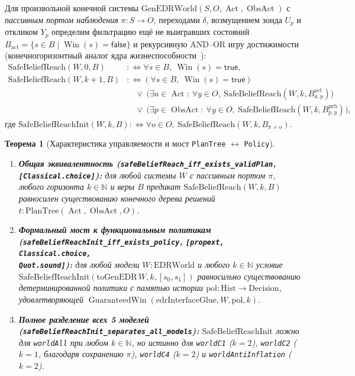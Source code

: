 \documentclass[10pt,a4paper]{article}
\theoremstyle{cleanthm}
\newtheorem{theorem}{Теорема}[section]
\theoremstyle{cleandef}
\DeclareMathOperator{\Win}{Win}
\DeclareMathOperator{\Act}{Act}
\DeclareMathOperator{\ObsAct}{ObsAct}
\DeclareMathOperator{\GuaranteedWin}{GuaranteedWin}
\begin{document}
Для произвольной конечной системы $\mathrm{GenEDRWorld}(S,O,\Act,\ObsAct)$ с \emph{пассивным портом наблюдения} $\pi:S\to O$, переходами $\delta$, возмущением зонда $U_p$ и откликом $Y_p$ определим фильтрацию ещё не выигравших состояний $B_{\mathrm{act}}=\{s\in B\mid\Win(s)=\mathsf{false}\}$ и рекурсивную AND--OR игру достижимости (конечногоризонтный аналог ядра жизнеспособности~\cite{aubin1991,bonet2000}):
\begin{align}
  \mathrm{SafeBeliefReach}(W,0,B) &:\iff \forall s\in B,\ \Win(s)=\mathsf{true}, \\
  \mathrm{SafeBeliefReach}(W,k+1,B) &:\iff (\forall s\in B,\ \Win(s)=\mathsf{true}) \nonumber\\
  &\quad\lor\; \bigl(\exists a\in\Act:\ \forall y\in O,\ \mathrm{SafeBeliefReach}(W,k,B_{a,y}^{\mathrm{act}})\bigr) \nonumber\\
  &\quad\lor\; \bigl(\exists p\in\ObsAct:\ \forall y\in O,\ \mathrm{SafeBeliefReach}(W,k,B_{p,y}^{\mathrm{prb}})\bigr),
\end{align}
где $\mathrm{SafeBeliefReachInit}(W,k,B) :\iff \forall o\in O,\ \mathrm{SafeBeliefReach}(W,k,B_{\pi=o})$.

\begin{theorem}[Характеристика управляемости и мост \texttt{PlanTree} $\leftrightarrow$ \texttt{Policy}]
\label{thm:sbr}
\begin{enumerate}
  \item \textbf{Общая эквивалентность (\texttt{safeBeliefReach\_\allowbreak iff\_\allowbreak exists\_\allowbreak validPlan}, \texttt{[Classical.choice]}):} для любой системы $W$ с пассивным портом $\pi$, любого горизонта $k\in\mathbb{N}$ и веры $B$ предикат $\mathrm{SafeBeliefReach}(W,k,B)$ равносилен существованию конечного дерева решений $t:\mathrm{PlanTree}(\Act,\ObsAct,O)$.
  \item \textbf{Формальный мост к функциональным политикам (\texttt{safeBeliefReachInit\_\allowbreak iff\_\allowbreak exists\_\allowbreak policy}, \texttt{[propext,}\\\texttt{Classical.choice,}\\\texttt{Quot.sound]}):} для любой модели $W:\mathrm{EDRWorld}$ и любого $k\in\mathbb{N}$ условие $\mathrm{SafeBeliefReachInit}(\allowbreak\mathrm{toGenEDR}\,W,\allowbreak k,\allowbreak [s_0,s_1])$ равносильно существованию детерминированной политики с памятью истории $\mathrm{pol}:\mathrm{Hist}\to\mathrm{Decision}$, удовлетворяющей $\GuaranteedWin(\allowbreak\mathrm{edrInterfaceGlue},\allowbreak W,\allowbreak \mathrm{pol},\allowbreak k)$.
  \item \textbf{Полное разделение всех 5 моделей (\texttt{safeBeliefReachInit\_\allowbreak separates\_\allowbreak all\_\allowbreak models}):} $\mathrm{SafeBeliefReachInit}$ ложно для \texttt{worldAll} при любом $k\in\mathbb{N}$, но истинно для \texttt{worldC1} ($k=2$), \texttt{worldC2} ($k=1$, благодаря сохранению $\pi$), \texttt{worldC4} ($k=2$) и \texttt{worldAntiInflation} ($k=2$).
\end{enumerate}
\end{theorem}
\end{document}
